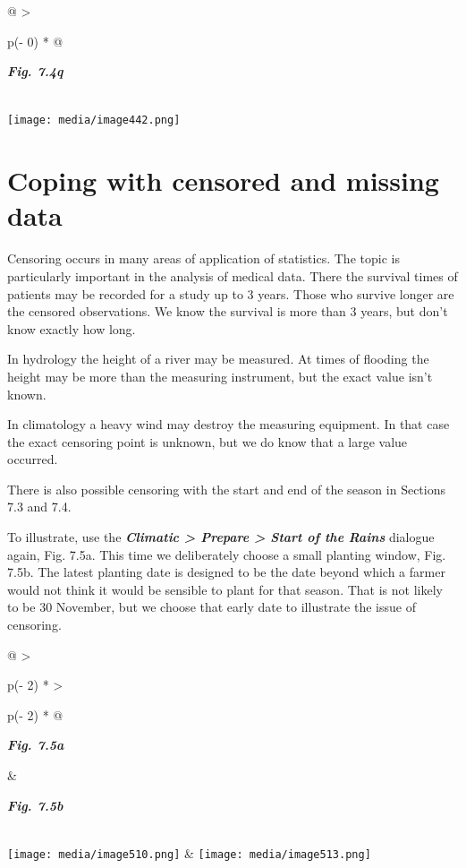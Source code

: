 \documentclass[
  letterpaper,
  DIV=11,
  numbers=noendperiod]{scrreprt}
\begin{document}
\begin{longtable}[]{@{}
  >{\raggedright\arraybackslash}p{(\columnwidth - 0\tabcolsep) * }@{}}
\toprule\noalign{}
\begin{minipage}[b]{\linewidth}\raggedright
\textbf{\emph{Fig. 7.4q}}
\end{minipage} \\
\midrule\noalign{}
\endhead
\bottomrule\noalign{}
\endlastfoot
\texttt{[image: media/image442.png]} \\
\end{longtable}

\section{Coping with censored and missing
data}\label{coping-with-censored-and-missing-data}

Censoring occurs in many areas of application of statistics. The topic
is particularly important in the analysis of medical data. There the
survival times of patients may be recorded for a study up to 3 years.
Those who survive longer are the censored observations. We know the
survival is more than 3 years, but don't know exactly how long.

In hydrology the height of a river may be measured. At times of flooding
the height may be more than the measuring instrument, but the exact
value isn't known.

In climatology a heavy wind may destroy the measuring equipment. In that
case the exact censoring point is unknown, but we do know that a large
value occurred.

There is also possible censoring with the start and end of the season in
Sections 7.3 and 7.4.

To illustrate, use the \textbf{\emph{Climatic \textgreater{} Prepare
\textgreater{} Start of the Rains}} dialogue again, Fig. 7.5a. This time
we deliberately choose a small planting window, Fig. 7.5b. The latest
planting date is designed to be the date beyond which a farmer would not
think it would be sensible to plant for that season. That is not likely
to be 30 November, but we choose that early date to illustrate the issue
of censoring.

\begin{longtable}[]{@{}
  >{\raggedright\arraybackslash}p{(\columnwidth - 2\tabcolsep) * }
  >{\raggedright\arraybackslash}p{(\columnwidth - 2\tabcolsep) * }@{}}
\toprule\noalign{}
\begin{minipage}[b]{\linewidth}\raggedright
\textbf{\emph{Fig. 7.5a}}
\end{minipage} & \begin{minipage}[b]{\linewidth}\raggedright
\textbf{\emph{Fig. 7.5b}}
\end{minipage} \\
\midrule\noalign{}
\endhead
\bottomrule\noalign{}
\endlastfoot
\texttt{[image: media/image510.png]} &
\texttt{[image: media/image513.png]} \\
\end{longtable}
\end{document}
